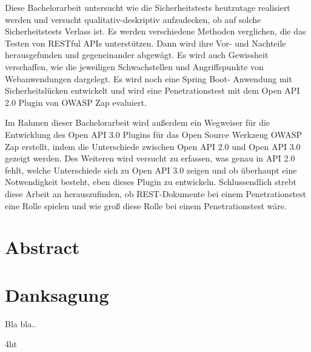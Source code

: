 \documentclass[
               fontsize=13pt,
               paper=a4,
               twoside,  %
               bibliography=totoc,
               headsepline,
               cleardoublepage=empty,
               parskip=half,
               final
               ]{scrbook}
\begin{document}
Diese Bachelorarbeit untersucht wie die Sicherheitstests heutzutage realisiert werden und versucht qualitativ-deskriptiv aufzudecken, ob auf solche Sicherheitstests Verlass ist. Es werden verschiedene Methoden verglichen, die das Testen von RESTful APIs unterstützen. Dann wird ihre Vor- und Nachteile herausgefunden und gegeneinander abgewägt. Es wird auch Gewissheit verschaffen, wie die jeweiligen Schwachstellen und Angriffspunkte von Webanwendungen dargelegt. Es wird noch eine Spring Boot- Anwendung mit Sicherheitslücken entwickelt und wird eine Penetrationstest mit dem Open API 2.0 Plugin von OWASP Zap evaluiert.

Im Rahmen dieser Bachelorarbeit wird außerdem ein Wegweiser für die Entwicklung des Open API 3.0 Plugins für das Open Source Werkzeug OWASP Zap erstellt, indem die Unterschiede zwischen Open API 2.0 und Open API 3.0 gezeigt werden. Des Weiteren wird versucht zu erfassen, was genau in API 2.0 fehlt, welche Unterschiede sich zu Open API 3.0 zeigen und ob überhaupt eine Notwendigkeit besteht, eben dieses Plugin zu entwickeln. Schlussendlich strebt diese Arbeit an herauszufinden, ob REST-Dokumente bei einem Penetrationstest eine Rolle spielen und wie groß diese Rolle bei einem Penetrationstest wäre.

\else
\section*{Abstract}
\fi

\cleardoublepage

\section*{Danksagung}
Bla bla..




\cleardoublepage




\iftex4ht
\else
{}
\fi

%
%

%
%
%
\setcounter{secnumdepth}{4}
\setcounter{tocdepth}{2}
\tableofcontents
\end{document}
